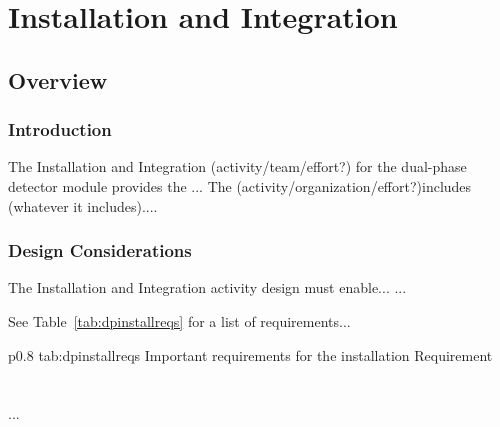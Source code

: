 \chapter{Installation and Integration}
\label{ch:fddp-install}

\section{Overview}
\label{sec:fddp-install-ov}


\subsection{Introduction}
\label{sec:fddp-install-intro}

The Installation and Integration (activity/team/effort?) for the dual-phase detector module provides the ...
The (activity/organization/effort?)includes (whatever it includes).... 


\subsection{Design Considerations}
\label{sec:fddp-install-des-consid}


The Installation and Integration activity design must enable... 
...


See Table~\ref{tab:dpinstallreqs} for a list of requirements...

\begin{dunetable}
{p{0.8\textwidth}}
{tab:dpinstallreqs}
{Important requirements for the installation}   
Requirement  \\ \toprowrule
  \\ \colhline
   \\ \colhline
 ...\\ 
\end{dunetable}



